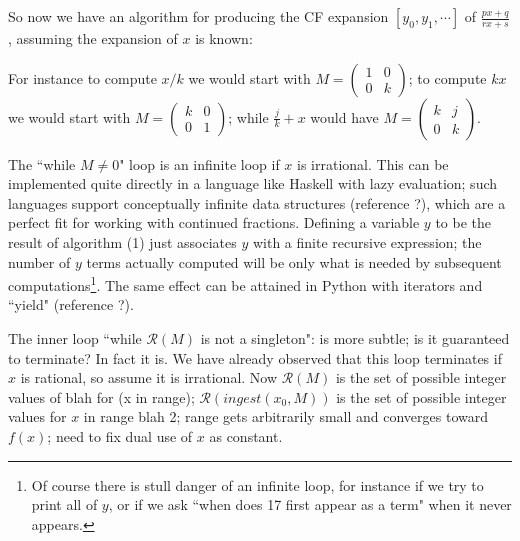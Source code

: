 \documentclass[11pt, oneside]{amsart}   	%
\newcommand{\pqrs}{\left(
\begin{smallmatrix} 
p & q\\ 
r & s 
\end{smallmatrix}
\right)}
\begin{document}
So now we have an algorithm for producing the CF expansion $[y_0,y_1,\cdots]$ of $\frac{px+q}{rx+s}$, assuming the expansion of $x$ is known:

\begin{algorithmic}
 
 
\STATE{$M \gets \pqrs$} 
           \ENDWHILE
\ENDWHILE
\end{algorithmic}

For instance to compute $x/k$ we would start with $M=\left(
\begin{smallmatrix} 
1 & 0\\ 
0 & k 
\end{smallmatrix}
\right)$; 
to compute $kx$ we would start with $M=\left(
\begin{smallmatrix} 
k & 0\\ 
0 & 1 
\end{smallmatrix}
\right)$; while $\frac{j}{k}+x$ would have $M=\left(
\begin{smallmatrix} 
k & j\\ 
0 & k 
\end{smallmatrix}
\right)$.

The ``while $M \neq 0$" loop is an infinite loop if $x$ is irrational. This can be implemented quite directly in a language like Haskell with lazy evaluation; such languages support conceptually infinite data structures (reference ?), which are a perfect fit for working with continued fractions. Defining a variable $y$ to be the result of algorithm (1) just associates $y$ with a finite recursive expression; the number of $y$ terms actually computed will be only what is needed by subsequent computations\footnote{Of course there is stull danger of an infinite loop, for instance if we try to print all of $y$, or if we ask ``when does 17 first appear as a term" when it never appears.}. The same effect can be attained in Python with iterators and ``yield" (reference ?).

The inner loop ``while $\mathcal{R}(M)$ is not a singleton": is more subtle; is it guaranteed to terminate? In fact it is. We have already observed that this loop terminates if $x$ is rational, so assume it is irrational. Now $\mathcal{R}(M)$ is the set of possible integer values of blah for (x in range); $\mathcal{R}(ingest(x_0,M))$ is the set of possible integer values for
$x$ in range blah 2; range gets arbitrarily small and converges toward $f(x)$; need to fix dual use of $x$ as constant.
\end{document}

